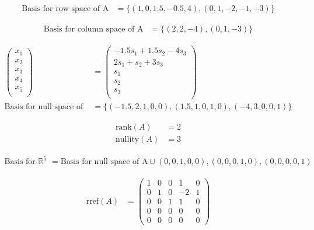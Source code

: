 \documentclass[12pt]{article}
\newenvironment{problem}[2][Problem]{\begin{trivlist}
\item[\hskip \labelsep {\bfseries #1}\hskip \labelsep {\bfseries #2.}]}{\end{trivlist}}
\begin{document}
\begin{problem}{3.b.i}
\end{problem}
\begin{align*}
\text{Basis for row space of A} &= \{(1, 0, 1.5, -0.5, 4), (0, 1, -2, -1, -3)\}
\end{align*}

\begin{problem}{3.b.ii}
\end{problem}
\begin{align*}
\text{Basis for column space of A} &= \{(2, 2, -4), (0, 1, -3)\}
\end{align*}

\begin{problem}{3.b.ii}
\end{problem}
\begin{align*}
\left( \begin{array}{c}
	x_1 \\
	x_2 \\
	x_3 \\
	x_4 \\
	x_5 \\
\end{array} \right)
&= 
\left( \begin{array}{c}
	-1.5s_1 + 1.5s_2 - 4s_3 \\
	2s_1 + s_2 + 3s_3 \\
	s_1 \\
	s_2 \\
	s_3 \\
\end{array} \right) \\
\text{Basis for null space of A} &= \{(-1.5, 2, 1, 0, 0), (1.5, 1, 0, 1, 0), (-4, 3, 0, 0, 1)\}
\end{align*}

\begin{problem}{3.c}
\end{problem}
\begin{align*}
\text{rank}(A) &= 2 \\
\text{nullity}(A) &= 3 
\end{align*}

\begin{problem}{3.d}
\end{problem}
\begin{align*}
\text{Basis for }\mathbb{R}^5 &= \text{Basis for null space of A} \cup {(0, 0, 1, 0, 0), (0, 0, 0, 1, 0), (0, 0, 0, 0, 1)}
\end{align*}

\begin{problem}{4.a}
\end{problem}
\begin{align*}
\text{rref}(A) &= 
\left( \begin{array}{ccccc}
	1 & 0 & 0 & 1 & 0 \\
	0 & 1 & 0 & -2 & 1 \\
	0 & 0 & 1 & 1 & 0 \\
	0 & 0 & 0 & 0 & 0 \\
	0 & 0 & 0 & 0 & 0 
\end{array} \right)
\end{align*}
\end{document}
